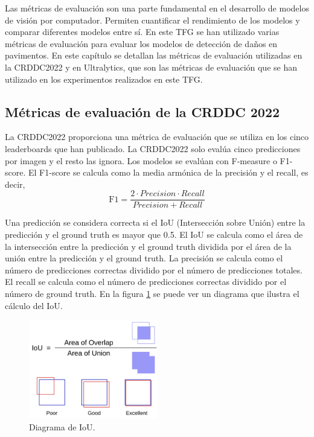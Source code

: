 
Las métricas de evaluación son una parte fundamental en el desarrollo de modelos de visión por computador. Permiten cuantificar el rendimiento de los modelos y comparar diferentes modelos entre sí. En este TFG se han utilizado varias métricas de evaluación para evaluar los modelos de detección de daños en pavimentos. En este capítulo se detallan las métricas de evaluación utilizadas en la CRDDC2022 y en Ultralytics, que son las métricas de evaluación que se han utilizado en los experimentos realizados en este TFG.

\subsection{Métricas de evaluación de la CRDDC 2022}
La CRDDC2022 proporciona una métrica de evaluación que se utiliza en los cinco leaderboards que han publicado. La CRDDC2022 solo evalúa cinco predicciones por imagen y el resto las ignora. Los modelos se evalúan con F-measure o F1-score. El F1-score se calcula como la media armónica de la precisión y el recall, es decir,
\begin{equation}
    \text{F1} = \frac{2 \cdot Precision \cdot Recall}{Precision + Recall}
\end{equation}

Una predicción se considera correcta si el IoU (Intersección sobre Unión) entre la predicción y el ground truth es mayor que 0.5. El IoU se calcula como el área de la intersección entre la predicción y el ground truth dividida por el área de la unión entre la predicción y el ground truth. La precisión se calcula como el número de predicciones correctas dividido por el número de predicciones totales. El recall se calcula como el número de predicciones correctas dividido por el número de ground truth. En la figura \ref{fig:IoU} se puede ver un diagrama que ilustra el cálculo del IoU.

\begin{figure}[H]
    \centering
    \includegraphics[width=0.5\textwidth]{img/IoU-diagram.png}
    \caption{Diagrama de IoU.}
    \label{fig:IoU}
\end{figure}

